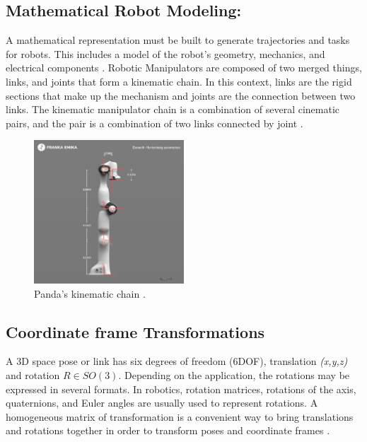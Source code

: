 \subsection*{Mathematical Robot Modeling:}
A mathematical representation must be built to generate trajectories and tasks for robots. This includes a model of the robot's geometry, mechanics, and electrical components \cite{zheng_mathematical_1985}. %
Robotic Manipulators are composed of two merged things, links, and joints that form a kinematic chain. In this context, links are the rigid sections that make up the mechanism and joints are the connection between two links. The kinematic manipulator chain is a combination of several cinematic pairs, and the pair is a combination of two links connected by joint \cite{al-naimi_robotics_2018}.

\begin{figure}[h]
  \centering
  \includegraphics[width=0.5\textwidth]{graphics/pandakinematicchain.png}
  \caption{Panda’s kinematic chain \cite{noauthor_robot_2017}.}
  \label{fig:pandachain}
\end{figure}

\subsection*{Coordinate frame Transformations}
A 3D space pose or link has six degrees of freedom (6DOF), translation \textit{(x,y,z)} and rotation $R \in SO(3)$. Depending on the application, the rotations may be expressed in several formats. 
In robotics, rotation matrices, rotations of the axis, quaternions, and Euler angles are usually used to represent rotations.
A homogeneous matrix of transformation is a convenient way to bring translations and rotations together in order to transform poses and coordinate frames \cite{cai_coordinate_2011}.


